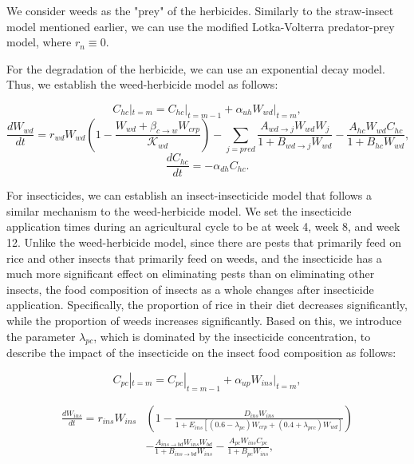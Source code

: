 \documentclass{HZNUMCM}
\begin{document}
        We consider weeds as the "prey" of the herbicides. 
        Similarly to the straw-insect model mentioned earlier, we can use the modified Lotka-Volterra predator-prey model, where \( r_n \equiv 0 \).
      
        For the degradation of the herbicide, we can use an exponential decay model. Thus, we establish the weed-herbicide model as follows:
      
        \begin{equation}
        C_{hc}|_{t=m} = C_{hc}|_{t=m-1} + \alpha_{uh} W_{wd}|_{t=m},
        \end{equation}
        \begin{equation}
        \frac{dW_{wd}}{dt} = r_{wd}W_{wd} \left( 1 - \frac{W_{wd} + \beta_{c \rightarrow w} W_{crp}}{\mathscr{K}_{wd}} \right) - \sum_{j=pred}{\frac{A_{wd\rightarrow j} W_{wd} W_{j}}{1 + B_{wd\rightarrow j} W_{wd}}} - \frac{A_{hc} W_{wd} C_{hc}}{1 + B_{hc} W_{wd}},
        \end{equation}
        \begin{equation}
        \frac{dC_{hc}}{dt} = - \alpha_{dh} C_{hc}.
        \end{equation}
        
        For insecticides, we can establish an insect-insecticide model that follows a similar mechanism to the weed-herbicide model. 
        We set the insecticide application times during an agricultural cycle to be at week 4, week 8, and week 12. Unlike the weed-herbicide model, 
        since there are pests that primarily feed on rice and other insects that primarily feed on weeds, 
        and the insecticide has a much more significant effect on eliminating pests than on eliminating other insects, 
        the food composition of insects as a whole changes after insecticide application. Specifically, 
        the proportion of rice in their diet decreases significantly, while the proportion of weeds increases significantly. 
        Based on this, we introduce the parameter \( \lambda_{pc} \), which is dominated by the insecticide concentration, 
        to describe the impact of the insecticide on the insect food composition as follows:
        
        \begin{equation}
          C_{pc}|_{t=m} = C_{pc}|_{t=m-1} + \alpha_{up} W_{ins}|_{t=m}, 
        \end{equation}

        \begin{equation}
          \begin{split}
            \frac{dW_{ins}}{dt} = r_{ins} W_{ins} &\left( 1 - \frac{D_{ins} W_{ins}}{1 + E_{ins} \left[ (0.6 - \lambda_{pc}) W_{crp} + (0.4 + \lambda_{prc}) W_{wd} \right]} \right) \\
            &-\frac{A_{ins\rightarrow bd} W_{ins} W_{bd}}{1 + B_{ins\rightarrow bd} W_{ins}} - \frac{A_{pc} W_{ins} C_{pc}}{1 + B_{pc} W_{ins}},
          \end{split}
      \end{equation}
\end{document}
